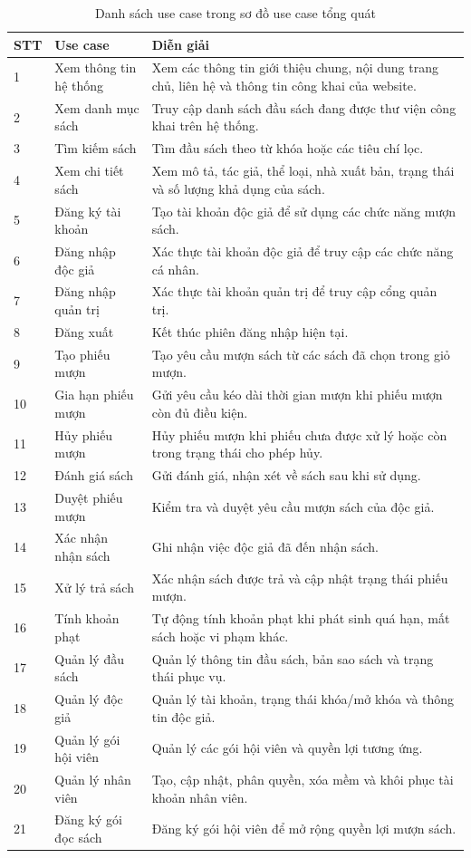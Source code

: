 \documentclass[../main.tex]{subfiles}
\begin{document}
\begin{longtable}{|p{1cm}|p{4cm}|p{8cm}|}
\caption{Danh sách use case trong sơ đồ use case tổng quát}\\
\hline
\textbf{STT} & \textbf{Use case} & \textbf{Diễn giải} \\
\hline
1 & Xem thông tin hệ thống & Xem các thông tin giới thiệu chung, nội dung trang chủ, liên hệ và thông tin công khai của website. \\
\hline
2 & Xem danh mục sách & Truy cập danh sách đầu sách đang được thư viện công khai trên hệ thống. \\
\hline
3 & Tìm kiếm sách & Tìm đầu sách theo từ khóa hoặc các tiêu chí lọc. \\
\hline
4 & Xem chi tiết sách & Xem mô tả, tác giả, thể loại, nhà xuất bản, trạng thái và số lượng khả dụng của sách. \\
\hline
5 & Đăng ký tài khoản & Tạo tài khoản độc giả để sử dụng các chức năng mượn sách. \\
\hline
6 & Đăng nhập độc giả & Xác thực tài khoản độc giả để truy cập các chức năng cá nhân. \\
\hline
7 & Đăng nhập quản trị & Xác thực tài khoản quản trị để truy cập cổng quản trị. \\
\hline
8 & Đăng xuất & Kết thúc phiên đăng nhập hiện tại. \\
\hline
9 & Tạo phiếu mượn & Tạo yêu cầu mượn sách từ các sách đã chọn trong giỏ mượn. \\
\hline
10 & Gia hạn phiếu mượn & Gửi yêu cầu kéo dài thời gian mượn khi phiếu mượn còn đủ điều kiện. \\
\hline
11 & Hủy phiếu mượn & Hủy phiếu mượn khi phiếu chưa được xử lý hoặc còn trong trạng thái cho phép hủy. \\
\hline
12 & Đánh giá sách & Gửi đánh giá, nhận xét về sách sau khi sử dụng. \\
\hline
13 & Duyệt phiếu mượn & Kiểm tra và duyệt yêu cầu mượn sách của độc giả. \\
\hline
14 & Xác nhận nhận sách & Ghi nhận việc độc giả đã đến nhận sách. \\
\hline
15 & Xử lý trả sách & Xác nhận sách được trả và cập nhật trạng thái phiếu mượn. \\
\hline
16 & Tính khoản phạt & Tự động tính khoản phạt khi phát sinh quá hạn, mất sách hoặc vi phạm khác. \\
\hline
17 & Quản lý đầu sách & Quản lý thông tin đầu sách, bản sao sách và trạng thái phục vụ. \\
\hline
18 & Quản lý độc giả & Quản lý tài khoản, trạng thái khóa/mở khóa và thông tin độc giả. \\
\hline
19 & Quản lý gói hội viên & Quản lý các gói hội viên và quyền lợi tương ứng. \\
\hline
20 & Quản lý nhân viên & Tạo, cập nhật, phân quyền, xóa mềm và khôi phục tài khoản nhân viên. \\
\hline
21 & Đăng ký gói đọc sách & Đăng ký gói hội viên để mở rộng quyền lợi mượn sách. \\
\hline
\end{longtable}
\end{document}
